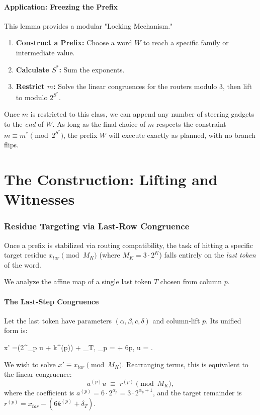 \documentclass[11pt,letterpaper]{amsart}
\def\mathrm#1{#1}%
\def\[{ }%
\def\]{ }%
\theoremstyle{definition}
\theoremstyle{plain}
\theoremstyle{plain}
\theoremstyle{remark}
\begin{document}
\subsection{Application: Freezing the Prefix}
This lemma provides a modular "Locking Mechanism."
\begin{enumerate}
    \item \textbf{Construct a Prefix:} Choose a word $W$ to reach a specific family or intermediate value.
    \item \textbf{Calculate $S^\ast$:} Sum the exponents.
    \item \textbf{Restrict $m$:} Solve the linear congruences for the routers modulo 3, then lift to modulo $2^{S^\ast}$.
\end{enumerate}
Once $m$ is restricted to this class, we can append any number of steering gadgets to the \emph{end} of $W$. As long as the final choice of $m$ respects the constraint $m \equiv m^\ast \pmod{2^{S^\ast}}$, the prefix $W$ will execute exactly as planned, with no branch flips.

\part{The Construction: Lifting and Witnesses}


\section{Residue Targeting via Last-Row Congruence}
\label{sec:residue-targeting}

Once a prefix is stabilized via routing compatibility, the task of hitting a specific target residue $x_{\mathrm{tar}} \pmod{M_K}$ (where $M_K = 3 \cdot 2^K$) falls entirely on the \emph{last token} of the word.

We analyze the affine map of a single last token $T$ chosen from column $p$.

\subsection{The Last-Step Congruence}
Let the last token have parameters $(\alpha, \beta, c, \delta)$ and column-lift $p$. Its unified form is:
\[
x' \;=\bigl(2^{\alpha_p} u + k^{(p)}\bigr) + \delta_T,
\qquad {} \alpha_p = \alpha + 6p, \quad u = \Big\lfloor {} \Big\rfloor.
\]
We wish to solve $x' \equiv x_{\mathrm{tar}} \pmod{M_K}$.
Rearranging terms, this is equivalent to the linear congruence:
\begin{equation}
\label{eq:last-row-cong}
a^{(p)} u \;\equiv\; r^{(p)} \pmod{M_K},
\end{equation}
where the coefficient is $a^{(p)} = 6 \cdot 2^{\alpha_p} = 3 \cdot 2^{\alpha_p+1}$, and the target remainder is $r^{(p)} = x_{\mathrm{tar}} - (6k^{(p)} + \delta_T)$.
\end{document}
